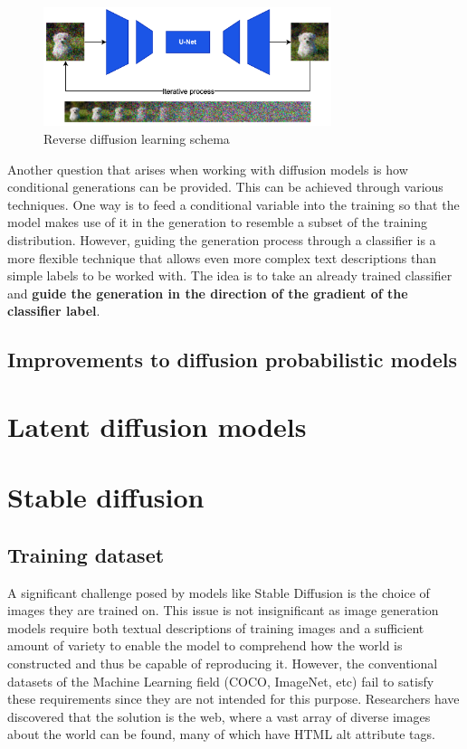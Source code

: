 \begin{figure}
    \centering
    \includegraphics[width=0.75\textwidth]{Pictures/ReverseDP.png} 
    \caption{Reverse diffusion learning schema}
    \label{fig:ReverseDP}
\end{figure}

Another question that arises when working with diffusion models is how conditional generations can be provided. This can be achieved through various techniques. One way is to feed a conditional variable into the training so that the model makes use of it in the generation to resemble a subset of the training distribution. However, guiding the generation process through a classifier is a more flexible technique that allows even more complex text descriptions than simple labels to be worked with. The idea is to take an already trained classifier and \textbf{guide the generation in the direction of the gradient of the classifier label}.

\subsection{Improvements to diffusion probabilistic models }

\section{Latent diffusion models}

\section{Stable diffusion}

\subsection{Training dataset}

A significant challenge posed by models like Stable Diffusion is the choice of images they are trained on. This issue is not insignificant as image generation models require both textual descriptions of training images and a sufficient amount of variety to enable the model to comprehend how the world is constructed and thus be capable of reproducing it. However, the conventional datasets of the Machine Learning field (COCO, ImageNet, etc) fail to satisfy these requirements since they are not intended for this purpose. Researchers have discovered that the solution is the web, where a vast array of diverse images about the world can be found, many of which have HTML alt attribute tags.


